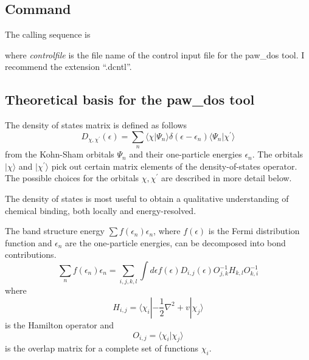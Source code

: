 \documentclass[final,12pt,makeidx,DIV=calc]{article}
\begin{document}
{{{{{{%
\subsection{Command}

The calling sequence is

\bigskip{}\bigskip

\noindent
where {\it controlfile} is the file name of the control input file for
the paw\_dos tool. I recommend the extension ``.dcntl''.


\subsection{Theoretical basis for the paw\_dos tool}

The density of states matrix is defined as follows
\begin{equation}
  D_{\chi,\chi^\prime}(\epsilon)
 =\sum_n
  \langle\chi|\Psi_n\rangle
\delta(\epsilon-\epsilon_n)
\langle\Psi_n|\chi^\prime\rangle
\end{equation}
from the Kohn-Sham orbitals $\Psi_n$ and their one-particle energies
$\epsilon_n$. The orbitals $|\chi\rangle$ and $|\chi^\prime\rangle$
pick out certain matrix elements of the density-of-states
operator. The possible choices for the orbitals $\chi,\chi^\prime$ are
described in more detail below.

The density of states is most useful to obtain a qualitative
understanding of chemical binding, both locally and energy-resolved.

The band structure energy $\sum f(\epsilon_n)\epsilon_n$, where
$f(\epsilon)$ is the Fermi distribution function and $\epsilon_n$ are
the one-particle energies, can be decomposed into bond
contributions. 
\begin{equation}
\sum_n f(\epsilon_n)\epsilon_n 
= \sum_{i,j,k,l} \int d\epsilon f(\epsilon)
D_{i,j}(\epsilon) O^{-1}_{j,k} H_{k,l}O^{-1}_{k,i}
\label{eq:dosebandeq1}
\end{equation}
where 
\begin{equation}
H_{i,j}=\langle\chi_i|-\frac{1}{2}\nabla^2+v|\chi_j\rangle
\end{equation}
is the Hamilton operator and 
\begin{equation}
O_{i,j}=\langle\chi_i|\chi_j\rangle
\end{equation}
is the overlap matrix for a complete set of functions $\chi_i$.

}}}}}}
\end{document}
